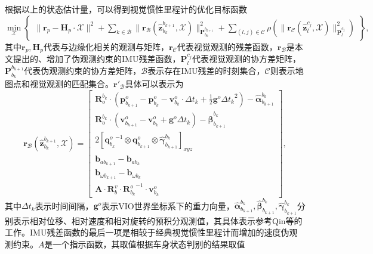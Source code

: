 根据以上的状态估计量，可以得到视觉惯性里程计的优化目标函数
\begin{equation}
  \min_{\mathcal{X}} \begin{Bmatrix} \| \symbf{r}_p - \symbf{H}_p \cdot \mathcal{X} \|^2 + \sum_{k\in\mathcal{B}} \| \symbf{r}_{\mathcal{B}}(\hat{\symbf{z}}_{b_k}^{b_{k+1}}, \mathcal{X}) \|^2_{\symbf{P}_{b_k}^{b_{k+1}}} + \sum_{(l,j)\in\mathcal{C}} \rho(\| \symbf{r}_{\mathcal{C}}(\hat{\symbf{z}}_{l}^{c_j}, \mathcal{X}) \|^2_{\symbf{P}_{l}^{c_j}}) \end{Bmatrix},
\end{equation}
其中$\symbf{r}_p, \symbf{H}_p$代表与边缘化相关的观测与矩阵，$\symbf{r}_{\mathcal{C}}$代表视觉观测的残差函数，$\symbf{r}_{\mathcal{B}}$是本文提出的、增加了伪观测约束的IMU残差函数，$\symbf{P}_{l}^{c_j}$代表视觉观测的协方差矩阵，$\symbf{P}_{b_k}^{b_{k+1}}$代表伪观测约束的协方差矩阵，$\mathcal{B}$表示存在IMU残差的时刻集合，$\mathcal{C}$则表示地图点和视觉观测的匹配集合。$\symbf{r}'_{\mathcal{B}}$具体可以表示为
\begin{equation}
  \symbf{r}_{\mathcal{B}}(\hat{\symbf{z}}_{b_k}^{b_{k+1}}, \mathcal{X}) = 
  \begin{bmatrix} 
    \symbf{R}_o^{b_k} \cdot (\symbf{p}_{b_{k+1}}^o -\symbf{p}_{b_k}^o-\symbf{v}_{b_k}^o\cdot\Delta t_k + \frac{1}{2}\symbf{g}^o{\Delta t_k}^2) - \hat{\symbf{\alpha}}_{b_{k+1}}^{b_k} \\
    \symbf{R}_o^{b_k} \cdot (\symbf{v}_{b_{k+1}}^o - \symbf{v}_{b_k}^o + \symbf{g}^o\Delta t_k) - \hat{\symbf{\beta}}_{b_{k+1}}^{b_k} \\
    2[{\symbf{q}^o_{b_k}}^{-1}\otimes\symbf{q}_{b_{k+1}}^o \otimes \hat{\symbf{\gamma}}_{b_{k+1}}^{b_k}]_{xyz} \\
    \symbf{b}_{ab_{k+1}} - \symbf{b}_{ab_{k}} \\
    \symbf{b}_{\omega b_{k+1}} - \symbf{b}_{\omega b_{k}} \\
    \symbf{A} \cdot \symbf{R}_b^v \cdot {\symbf{R}_{b_k}^o}^{-1} \cdot \symbf{v}_{b_k}^o
  \end{bmatrix},
  \label{eq:imu_residual}
\end{equation}
其中$\Delta t_k$表示时间间隔，$\symbf{g}^o$表示VIO世界坐标系下的重力向量，$\hat{\symbf{\alpha}}_{b_{k+1}}^{b_k}, \hat{\symbf{\beta}}_{b_{k+1}}^{b_k}, \hat{\symbf{\gamma}}_{b_{k+1}}^{b_k}$分别表示相对位移、相对速度和相对旋转的预积分观测值，其具体表示参考Qin等\cite{qin2018vins}的工作。IMU残差函数的最后一项是相较于经典视觉惯性里程计而增加的速度伪观测约束。$A$是一个指示函数，其取值根据车身状态判别的结果取值
